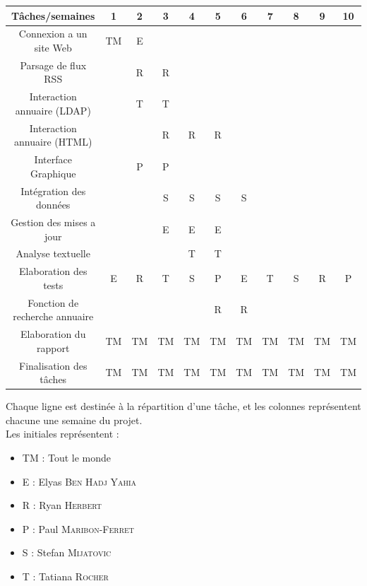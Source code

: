 \documentclass [pdftex,12pt] {report}
\begin{document}
\begin{table}[h!]
    \begin{tabular}{|c|c|c|c|c|c|c|c|c|c|c|}
        \hline
        Tâches/semaines                       & 1             & 2       & 3       & 4       & 5       & 6      & 7       & 8      & 9    & 10   \\ \hline
        Connexion a un site Web               & TM & E   & ~       & ~       & ~       & ~      & ~       & ~      & ~    & ~    \\ \hline
        Parsage de flux RSS                   & ~             & R    & R    & ~       & ~       & ~      & ~       & ~      & ~    & ~    \\ \hline
        Interaction annuaire (LDAP)    & ~             & T & T & ~       & ~       & ~      & ~       & ~      & ~    & ~    \\ \hline
        Interaction annuaire (HTML)    & ~             & ~       & R    & R    & R    & ~      & ~       & ~      & ~    & ~    \\ \hline
        Interface Graphique                   & ~             & P    & P    & ~       & ~       & ~      & ~       & ~      & ~    & ~    \\ \hline
        Intégration des données  & ~             & ~       & S  & S  & S  & S & ~       & ~      & ~    & ~    \\ \hline
        Gestion des mises a jour              & ~             & ~       & E   & E   & E   & ~      & ~       & ~      & ~    & ~    \\ \hline
        Analyse textuelle                     & ~             & ~       & ~       & T & T & ~      & ~       & ~      & ~    & ~    \\ \hline
        Elaboration des tests                 & E         & R    & T & S  & P    & E  & T & S & R & P \\ \hline
        Fonction de recherche annuaire & ~             & ~       & ~       & ~       & R    & R   & ~       & ~      & ~    & ~    \\ \hline
        Elaboration du rapport                & TM & TM & TM & TM & TM & TM & TM & TM & TM & TM    \\ \hline
        Finalisation des tâches               & TM & TM & TM & TM & TM & TM & TM & TM & TM & TM    \\
        \hline
    \end{tabular}
\end{table}
Chaque ligne est destinée à la répartition d'une tâche, et les colonnes représentent chacune une semaine du projet.\\
Les initiales représentent :\\
\begin{itemize}
\item TM : Tout le monde
\item E : Elyas \textsc{Ben Hadj Yahia}
\item R : Ryan \textsc{Herbert}
\item P : Paul \textsc{Maribon-Ferret}
\item S : Stefan \textsc{Mijatovic}
\item T : Tatiana \textsc{Rocher}
\end{itemize}
\end{document}
